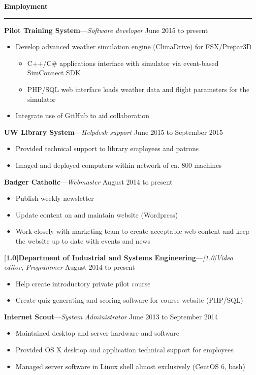 \documentclass[12pt,letterpaper]{article}
\newenvironment{details}{
    \vspace{-1em}
    \begin{itemize}
        \renewcommand \labelitemi{\labelitemiv}
        \setlength{\itemsep}{0pt}
        \setlength{\parskip}{-1pt}
        \setlength{\parsep}{0pt}
    }{
    \end{itemize}
    \vspace{-.5em}
}
\newcommand{\hr} {
    \vspace{-1em}
    \par\rule{\textwidth}{1pt}
    \vspace{-1.5em}
}
\newcommand{\ressection}[1] {
    \par{\large \textbf{#1}}
    \hr
}
\newenvironment{employment} {
    \setlength{\parskip}{0pt}
    \ressection{Employment}
}{
    \vspace{0.5em}
}
\newcommand{\employer}[3] {
    \vspace{3pt}
    {\par\textbf{#1}---\textit{#2} \hfill #3}
    \par
}
\begin{document}
\begin{employment} 

\employer{Pilot Training System}{Software developer}{June 2015 to present}
\begin{details}
    \item Develop advanced weather simulation engine (ClimaDrive) for FSX/Prepar3D
    \begin{details}
        \item C++/C\# applications interface with simulator via event-based SimConnect SDK
        \item PHP/SQL web interface loads weather data and flight parameters for the simulator
    \end{details}
    \item Integrate use of GitHub to aid collaboration
\end{details}

\employer{UW Library System}{Helpdesk support}{June 2015 to September 2015}
\begin{details}
    \item Provided technical support to library employees and patrons
    \item Imaged and deployed computers within network of ca. 800 machines
\end{details}

\employer{Badger Catholic}{Webmaster}{August 2014 to present}
\begin{details}
    \item Publish weekly newsletter
    \item Update content on and maintain website (Wordpress)
    \item Work closely with marketing team to create acceptable web content and keep the website up to date with events and news
\end{details}

\employer{\scalebox{.9}[1.0]{Department of Industrial and Systems Engineering}}{\scalebox{.9}[1.0]{Video editor, Programmer}}{August 2014 to present}
\begin{details}
    \item Help create introductory private pilot course
    \item Create quiz-generating and scoring software for course website (PHP/SQL)
\end{details}

\employer{Internet Scout}{System Administrator}{June 2013 to September 2014}
\begin{details}
    \item Maintained desktop and server hardware and software
    \item Provided OS X desktop and application technical support for employees
    \item Managed server software in Linux shell almost exclusively (CentOS 6, bash)
\end{details}

\end{employment}
\end{document}
